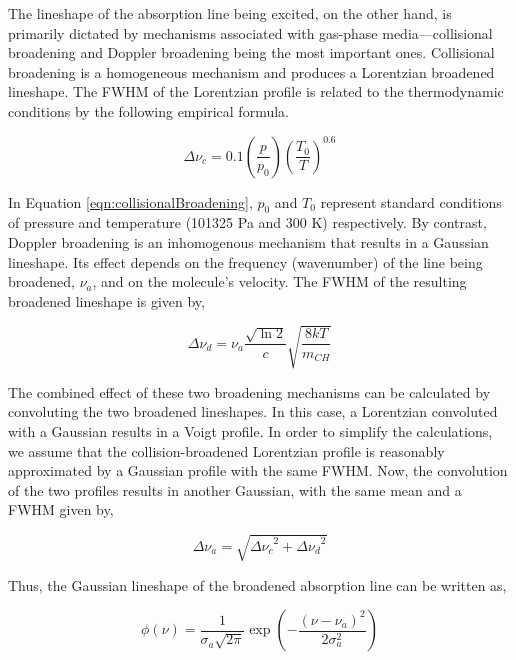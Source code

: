 The lineshape of the absorption line being excited, on the other hand, is primarily dictated by mechanisms associated with gas-phase media---collisional broadening and Doppler broadening being the most important ones.
Collisional broadening is a homogeneous mechanism and produces a Lorentzian broadened lineshape.
The FWHM of the Lorentzian profile is related to the thermodynamic conditions by the following empirical formula.

\begin{equation}
  \Delta\nu_c = 0.1 \left(\frac{p}{p_0}\right) \left(\frac{T_0}{T}\right)^{0.6}
  \label{eqn:collisionalBroadening}
\end{equation}

In Equation \ref{eqn:collisionalBroadening}, \(p_0\) and \(T_0\) represent standard conditions of pressure and temperature (101325 Pa and 300 K) respectively.
By contrast, Doppler broadening is an inhomogenous mechanism that results in a Gaussian lineshape.
Its effect depends on the frequency (wavenumber) of the line being broadened, \(\nu_a\), and on the molecule's velocity.
The FWHM of the resulting broadened lineshape is given by,

\begin{equation}
  \Delta\nu_d = \nu_a \frac{\sqrt{ \ln 2 } }{c} \sqrt{\frac{8kT}{m_{CH}}}
  \label{eqn:dopplerBroadening}
\end{equation}

The combined effect of these two broadening mechanisms can be calculated by convoluting the two broadened lineshapes.
In this case, a Lorentzian convoluted with a Gaussian results in a Voigt profile.
In order to simplify the calculations, we assume that the collision-broadened Lorentzian profile is reasonably approximated by a Gaussian profile with the same FWHM.
Now, the convolution of the two profiles results in another Gaussian, with the same mean and a FWHM given by,

\begin{equation}
  \Delta\nu_a = \sqrt{ { \Delta\nu_c }^2 + { \Delta\nu_d }^2 }
  \label{eqn:broadening}
\end{equation}

Thus, the Gaussian lineshape of the broadened absorption line can be written as,

\begin{equation}
  \phi(\nu) = \frac{1}{\sigma_a\sqrt{2\pi}} \exp{\left(-\dfrac{(\nu-\nu_a)^2}{2\sigma_a^2}\right)}
  \label{eqn:absorptionLineShape}
\end{equation}

